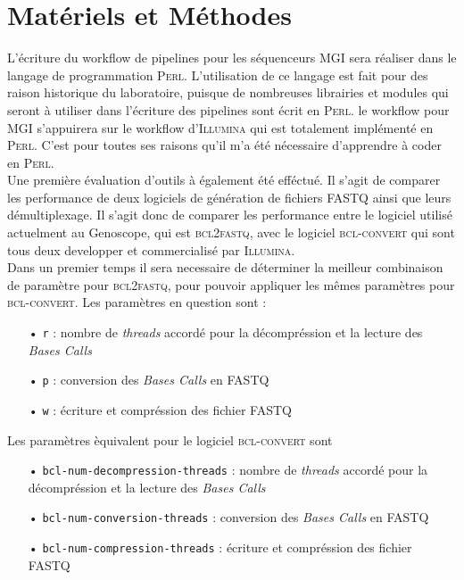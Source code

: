 \section{Matériels et Méthodes}
L'écriture du workflow de pipelines pour les séquenceurs \textsc{MGI} sera réaliser dans le langage de programmation \textsc{Perl}. L'utilisation de ce langage est fait pour des raison historique du laboratoire, puisque de nombreuses librairies et modules qui seront à utiliser dans l'écriture des pipelines sont écrit en \textsc{Perl}. le workflow pour \textsc{MGI} s'appuirera sur le workflow d'\textsc{Illumina} qui est totalement implémenté en \textsc{Perl}. C'est pour toutes ses raisons qu'il m'a été nécessaire d'apprendre à coder en \textsc{Perl}. \\

Une première évaluation d'outils à également été efféctué. Il s'agit de comparer les performance de deux logiciels de génération de fichiers \textsc{FASTQ} ainsi que leurs démultiplexage. Il s'agit donc de comparer les performance entre le logiciel utilisé actuelment au Genoscope, qui est \textsc{bcl2fastq}, avec le logiciel \textsc{bcl-convert} qui sont tous deux developper et commercialisé par \textsc{Illumina}.\\
Dans un premier temps il sera necessaire de déterminer la meilleur combinaison de paramètre pour \textsc{bcl2fastq}, pour pouvoir appliquer les mêmes paramètres pour \textsc{bcl-convert}. Les paramètres en question sont :
\begin{itemize}
    \item[•] \texttt{r} : nombre de \emph{threads} accordé pour la décompréssion et la lecture des \emph{Bases Calls}
    \item[•] \texttt{p} : conversion des \emph{Bases Calls} en \textsc{FASTQ}
    \item[•] \texttt{w} : écriture et compréssion des fichier \textsc{FASTQ}
\end{itemize}
Les paramètres èquivalent pour le logiciel \textsc{bcl-convert} sont 
\begin{itemize}
    \item[•] \texttt{bcl-num-decompression-threads} : nombre de \emph{threads} accordé pour la décompréssion et la lecture des \emph{Bases Calls}
    \item[•] \texttt{bcl-num-conversion-threads} : conversion des \emph{Bases Calls} en \textsc{FASTQ}
    \item[•] \texttt{bcl-num-compression-threads} : écriture et compréssion des fichier \textsc{FASTQ}\\
\end{itemize}

